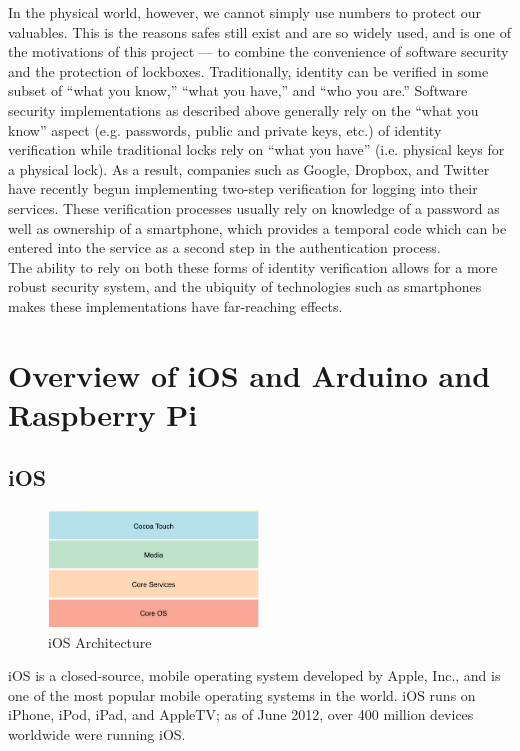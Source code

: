 \documentclass[twoside]{article}
\begin{document}
\begin{multicols}{2}
In the physical world, however, we cannot simply use numbers to protect our valuables. This is the reasons safes still exist and are so widely used, and is one of the motivations of this project --- to combine the convenience of software security and the protection of lockboxes. Traditionally, identity can be verified in some subset of “what you know,” “what you have,” and “who you are.” Software security implementations as described above generally rely on the “what you know” aspect (e.g. passwords, public and private keys, etc.) of identity verification while traditional locks rely on “what you have” (i.e. physical keys for a physical lock). As a result, companies  such as Google, Dropbox, and Twitter have recently begun implementing two-step verification for logging into their services. These verification processes usually rely on knowledge of a password as well as ownership of a smartphone, which provides a temporal code which can be entered into the service as a second step in the authentication process. \\

The ability to rely on both these forms of identity verification allows for a more robust security system, and the ubiquity of technologies such as smartphones makes these implementations have far-reaching effects.\\

\section{Overview of iOS and Arduino and Raspberry Pi}

\subsection{iOS}

\begin{figure}[H]
\centering
\includegraphics[width=0.5\textwidth]{ios_arch.png}
\caption{iOS Architecture}
\end{figure}

iOS is a closed-source, mobile operating system developed by Apple, Inc., and is one of the most popular mobile operating systems in the world. iOS runs on iPhone, iPod, iPad, and AppleTV; as of June 2012, over 400 million devices worldwide were running iOS. \\


\end{multicols}
\end{document}
